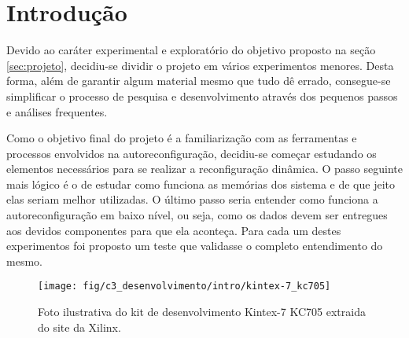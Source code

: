 \documentclass[11pt,a4paper,oneside]{book}
\begin{document}
	\frontmatter
	\tableofcontents
	\mainmatter
	
	\newcommand\qt[1]{\lq\lq{}#1\rq\rq{}}
	\newcommand\qti[1]{\lq\lq{}\textit{#1}\rq\rq{}}
\fi

                      
\chapter{Introdu\c{c}\~{a}o}
\label{cap:introducao}
\vspace{0.8cm}

Devido ao caráter experimental e exploratório do objetivo proposto na seção \ref{sec:projeto}, decidiu-se dividir o projeto em vários experimentos menores.
Desta forma, além de garantir algum material mesmo que tudo dê errado, consegue-se simplificar o processo de pesquisa e desenvolvimento através dos pequenos passos e análises frequentes.

Como o objetivo final do projeto é a familiarização com as ferramentas e processos envolvidos na autoreconfiguração, decidiu-se começar estudando os elementos necessários para se realizar a reconfiguração dinâmica.
O passo seguinte mais lógico é o de estudar como funciona as memórias dos sistema e de que jeito elas seriam melhor utilizadas.
O último passo seria entender como funciona a autoreconfiguração em baixo nível, ou seja, como os dados devem ser entregues aos devidos componentes para que ela aconteça.
Para cada um destes experimentos foi proposto um teste que validasse o completo entendimento do mesmo.

\begin{figure}[h]
\centering
\texttt{[image: fig/c3\_desenvolvimento/intro/kintex-7\_kc705]}
\caption{Foto ilustrativa do kit de desenvolvimento Kintex-7 KC705 extraida do site da Xilinx.}
\label{fig:kc705}
\end{figure}
\end{document}
